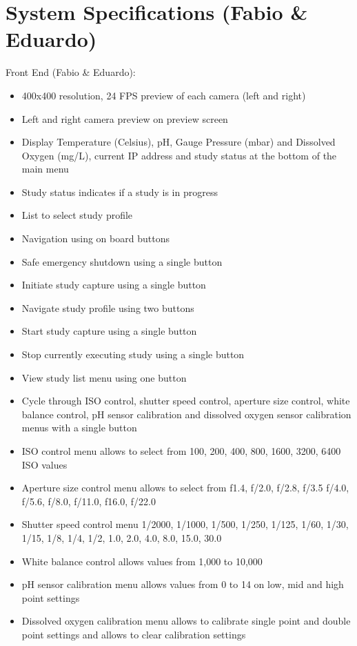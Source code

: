 \section{System Specifications (Fabio \& Eduardo)}
Front End (Fabio \& Eduardo):
\begin{itemize}
	\item 400x400 resolution, 24 FPS preview of each camera (left and right)
	\item Left and right camera preview on preview screen
	\item Display Temperature (Celsius), pH, Gauge Pressure (mbar) and Dissolved Oxygen (mg/L), current IP address and study status at the bottom of the main menu
	\item Study status indicates if a study is in progress
	\item List to select study profile
	\item Navigation using on board buttons
	\item Safe emergency shutdown using a single button
	\item Initiate study capture using a single button
	\item Navigate study profile using two buttons
	\item Start study capture using a single button
	\item Stop currently executing study using a single button
	\item View study list menu using one button
	\item Cycle through ISO control, shutter speed control, aperture size control, white balance control, pH sensor calibration and dissolved oxygen sensor calibration menus with a single button
	\item ISO control menu allows to select from 100, 200, 400, 800, 1600, 3200, 6400 ISO values
	\item Aperture size control menu allows to select from f1.4, f/2.0, f/2.8, f/3.5 f/4.0, f/5.6, f/8.0, f/11.0, f16.0, f/22.0
	\item Shutter speed control menu 1/2000, 1/1000, 1/500, 1/250, 1/125, 1/60, 1/30, 1/15, 1/8, 1/4, 1/2, 1.0, 2.0, 4.0, 8.0, 15.0, 30.0
	\item White balance control allows values from 1,000 to 10,000
	\item pH sensor calibration menu allows values from 0 to 14 on low, mid and high point settings
	\item Dissolved oxygen calibration menu allows to calibrate single point and double point settings and allows to clear calibration settings
\end{itemize}

